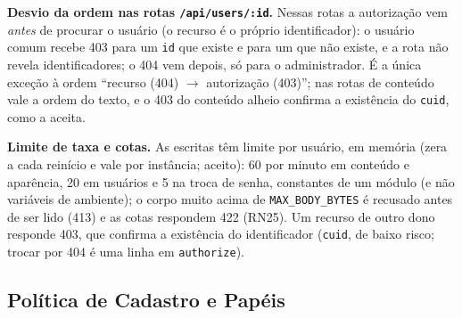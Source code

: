 \textbf{Desvio da ordem nas rotas \texttt{/api/users/:id}.} Nessas rotas a autorização vem \emph{antes} de procurar o usuário (o recurso é o próprio identificador): o usuário comum recebe 403 para um \texttt{id} que existe e para um que não existe, e a rota não revela identificadores; o 404 vem depois, só para o administrador. É a única exceção à ordem ``recurso (404) $\rightarrow$ autorização (403)''; nas rotas de conteúdo vale a ordem do texto, e o 403 do conteúdo alheio confirma a existência do \texttt{cuid}, como a  aceita.

\textbf{Limite de taxa e cotas.} As escritas têm limite por usuário, em memória (zera a cada reinício e vale por instância; aceito): 60 por minuto em conteúdo e aparência, 20 em usuários e 5 na troca de senha, constantes de um módulo (e não variáveis de ambiente); o corpo muito acima de \texttt{MAX\_BODY\_BYTES} é recusado antes de ser lido (413) e as cotas respondem 422  (RN25). Um recurso de outro dono responde 403, que confirma a existência do identificador (\texttt{cuid}, de baixo risco; trocar por 404 é uma linha em \texttt{authorize}).

\subsection{Política de Cadastro e Papéis}

